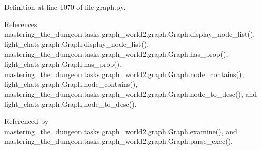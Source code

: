 Definition at line 1070 of file graph.\+py.



References mastering\+\_\+the\+\_\+dungeon.\+tasks.\+graph\+\_\+world2.\+graph.\+Graph.\+display\+\_\+node\+\_\+list(), light\+\_\+chats.\+graph.\+Graph.\+display\+\_\+node\+\_\+list(), mastering\+\_\+the\+\_\+dungeon.\+tasks.\+graph\+\_\+world2.\+graph.\+Graph.\+has\+\_\+prop(), light\+\_\+chats.\+graph.\+Graph.\+has\+\_\+prop(), mastering\+\_\+the\+\_\+dungeon.\+tasks.\+graph\+\_\+world2.\+graph.\+Graph.\+node\+\_\+contains(), light\+\_\+chats.\+graph.\+Graph.\+node\+\_\+contains(), mastering\+\_\+the\+\_\+dungeon.\+tasks.\+graph\+\_\+world2.\+graph.\+Graph.\+node\+\_\+to\+\_\+desc(), and light\+\_\+chats.\+graph.\+Graph.\+node\+\_\+to\+\_\+desc().



Referenced by mastering\+\_\+the\+\_\+dungeon.\+tasks.\+graph\+\_\+world2.\+graph.\+Graph.\+examine(), and mastering\+\_\+the\+\_\+dungeon.\+tasks.\+graph\+\_\+world2.\+graph.\+Graph.\+parse\+\_\+exec().

